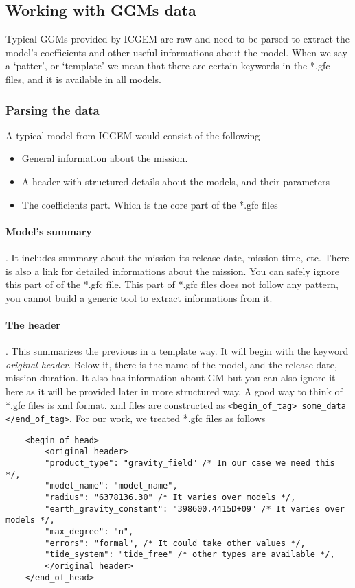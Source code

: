 \subsection{Working with GGMs data}

Typical GGMs provided by ICGEM are raw and need to be parsed to extract the model's coefficients and other useful informations about the model. When we say a `patter', or `template' we mean that there are certain keywords in the *.gfc files, and it is available in all models.

\subsubsection{Parsing the data}
A typical model from ICGEM would consist of the following

\begin{itemize}
	\item {General information about the mission}. 
	\item {A header with structured details about the models, and their parameters}
	\item {The coefficients part. Which is the core part of the *.gfc files}
\end{itemize}

	\paragraph{Model's summary}. It includes summary about the mission its release date, mission time, etc. There is also a link for detailed informations about the mission. You can safely ignore this part of of the *.gfc file. This part of *.gfc files does not follow any pattern, you cannot build a generic tool to extract informations from it.
	\paragraph{The header}. This summarizes the previous in a template way. It will begin with the keyword \textit{original header}. Below it, there is the name of the model, and the release date, mission duration. It also has information about GM but you can also ignore it here as it will be provided later in more structured way. A good way to think of *.gfc files is xml format. xml files are constructed as \lstinline|<begin_of_tag> some_data </end_of_tag>|. For our work, we treated *.gfc files as follows
	\begin{lstlisting}
	<begin_of_head>
		<original header>
		"product_type": "gravity_field" /* In our case we need this */,
		"model_name": "model_name",
		"radius": "6378136.30" /* It varies over models */,
		"earth_gravity_constant": "398600.4415D+09" /* It varies over models */,
		"max_degree": "n",
		"errors": "formal", /* It could take other values */,
		"tide_system": "tide_free" /* other types are available */,
		</original header>
	</end_of_head>
	\end{lstlisting}
	
